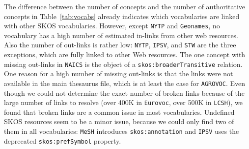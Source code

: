 
The difference between the number of concepts and the number of authoritative concepts in Table~\ref{tab:vocabs} already indicates which vocabularies are linked with other SKOS vocabularies.
However, except \texttt{NYTP} and \texttt{Geonames}, no vocabulary has a high number of estimated in-links from other web resources.
Also the number of out-links is rather low: \texttt{NYTP}, \texttt{IPSV}, and \texttt{STW} are the three exceptions, which are fully linked to other Web resources. The one concept with missing out-links in \texttt{NAICS} is the object of a \texttt{skos:broaderTransitive} relation. One reason for a high number of missing out-links is that the links were not available in the main thesaurus file, which is at least the case for \texttt{AGROVOC}.
Even though we could not determine the exact number of broken links because of the large number of links to resolve  (over 400K in \texttt{Eurovoc}, over 500K in \texttt{LCSH}), we found that broken links are a common issue in most vocabularies.
Undefined SKOS resources seem to be a minor issue, because we could only find two of them in all vocabularies: \texttt{MeSH} introduces \texttt{skos:annotation} and \texttt{IPSV} uses the deprecated \texttt{skos:prefSymbol} property.
